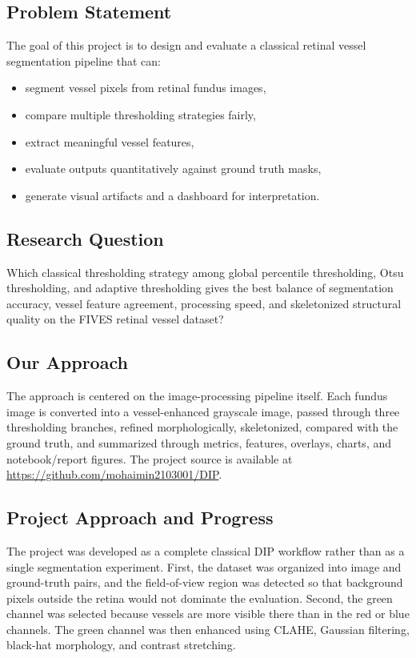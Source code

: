 \documentclass[12pt,a4paper]{article}
\newcommand{\projectrepo}{\url{https://github.com/mohaimin2103001/DIP}}
\begin{document}
\subsection{Problem Statement}
The goal of this project is to design and evaluate a classical retinal vessel segmentation pipeline that can:
\begin{itemize}
    \item segment vessel pixels from retinal fundus images,
    \item compare multiple thresholding strategies fairly,
    \item extract meaningful vessel features,
    \item evaluate outputs quantitatively against ground truth masks,
    \item generate visual artifacts and a dashboard for interpretation.
\end{itemize}

\subsection{Research Question}
Which classical thresholding strategy among global percentile thresholding, Otsu thresholding, and adaptive thresholding gives the best balance of segmentation accuracy, vessel feature agreement, processing speed, and skeletonized structural quality on the FIVES retinal vessel dataset?

\subsection{Our Approach}
The approach is centered on the image-processing pipeline itself. Each fundus image is converted into a vessel-enhanced grayscale image, passed through three thresholding branches, refined morphologically, skeletonized, compared with the ground truth, and summarized through metrics, features, overlays, charts, and notebook/report figures. The project source is available at \projectrepo.

\subsection{Project Approach and Progress}
The project was developed as a complete classical DIP workflow rather than as a single segmentation experiment. First, the dataset was organized into image and ground-truth pairs, and the field-of-view region was detected so that background pixels outside the retina would not dominate the evaluation. Second, the green channel was selected because vessels are more visible there than in the red or blue channels. The green channel was then enhanced using CLAHE, Gaussian filtering, black-hat morphology, and contrast stretching.
\end{document}

